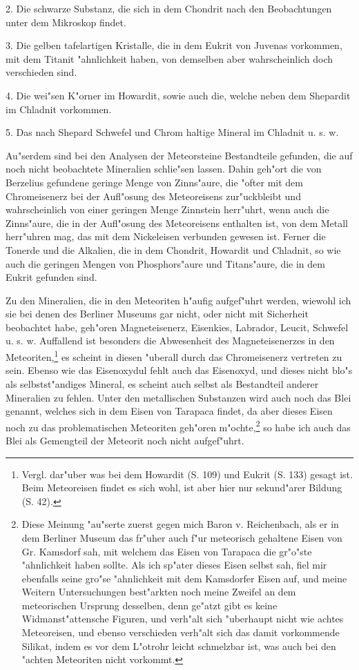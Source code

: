 \documentclass[a4paper, 11pt, oneside]{article}
\begin{document}
2. Die schwarze Substanz, die sich in dem Chondrit nach den Beobachtungen unter dem Mikroskop findet.

3. Die gelben tafelartigen Kristalle, die in dem Eukrit von Juvenas vorkommen, mit dem Titanit "ahnlichkeit haben, von demselben aber wahrscheinlich doch verschieden sind.

4. Die wei"sen K"orner im Howardit, sowie auch die, welche neben dem Shepardit im Chladnit vorkommen.

5. Das nach Shepard Schwefel und Chrom haltige Mineral im Chladnit u. s. w.

Au"serdem sind bei den Analysen der Meteorsteine Bestandteile gefunden, die auf noch nicht beobachtete Mineralien schlie"sen lassen. Dahin geh"ort die von Berzelius gefundene geringe Menge von Zinns"aure, die "ofter mit dem Chromeisenerz bei der Aufl"osung des Meteoreisens zur"uckbleibt und wahrscheinlich von einer geringen Menge Zinnstein herr"uhrt, wenn auch die Zinns"aure, die in der Aufl"osung des Meteoreisens enthalten ist, von dem Metall herr"uhren mag, das mit dem Nickeleisen verbunden gewesen ist. Ferner die Tonerde und die Alkalien, die in dem Chondrit, Howardit und Chladnit, so wie auch die geringen Mengen von Phosphors"aure und Titans"aure, die in dem Eukrit gefunden sind.

Zu den Mineralien, die in den Meteoriten h"aufig aufgef"uhrt werden, wiewohl ich sie bei denen des Berliner Museums gar nicht, oder nicht mit Sicherheit beobachtet habe, geh"oren Magneteisenerz, Eisenkies, Labrador, Leucit, Schwefel u. s. w. Auffallend ist besonders die Abwesenheit des Magneteisenerzes in den Meteoriten,\footnote{Vergl. dar"uber was bei dem Howardit (S. 109) und Eukrit (S. 133) gesagt ist. Beim Meteoreisen findet es sich wohl, ist aber hier nur sekund"arer Bildung (S. 42).} es scheint in diesen "uberall durch das Chromeisenerz vertreten zu sein. Ebenso wie das Eisenoxydul fehlt auch das Eisenoxyd, und dieses nicht blo"s als selbstst"andiges Mineral, es scheint auch selbst als Bestandteil anderer Mineralien zu fehlen. Unter den metallischen Substanzen wird auch noch das Blei genannt, welches sich in dem Eisen von Tarapaca findet, da aber dieses Eisen noch zu das problematischen Meteoriten geh"oren m"ochte,\footnote{Diese Meinung "au"serte zuerst gegen mich Baron v. Reichenbach, als er in dem Berliner Museum das fr"uher auch f"ur meteorisch gehaltene Eisen von Gr. Kamsdorf sah, mit welchem das Eisen von Tarapaca die gr"o"ste "ahnlichkeit haben sollte. Als ich sp"ater dieses Eisen selbst sah, fiel mir ebenfalls seine gro"se "ahnlichkeit mit dem Kamsdorfer Eisen auf, und meine Weitern Untersuchungen best"arkten noch meine Zweifel an dem meteorischen Ursprung desselben, denn ge"atzt gibt es keine Widmanst"attensche Figuren, und verh"alt sich "uberhaupt nicht wie achtes Meteoreisen, und ebenso verschieden verh"alt sich das damit vorkommende Silikat, indem es vor dem L"otrohr leicht schmelzbar ist, was auch bei den "achten Meteoriten nicht vorkommt.} so habe ich auch das Blei als Gemengteil der Meteorit noch nicht aufgef"uhrt.
\end{document}

